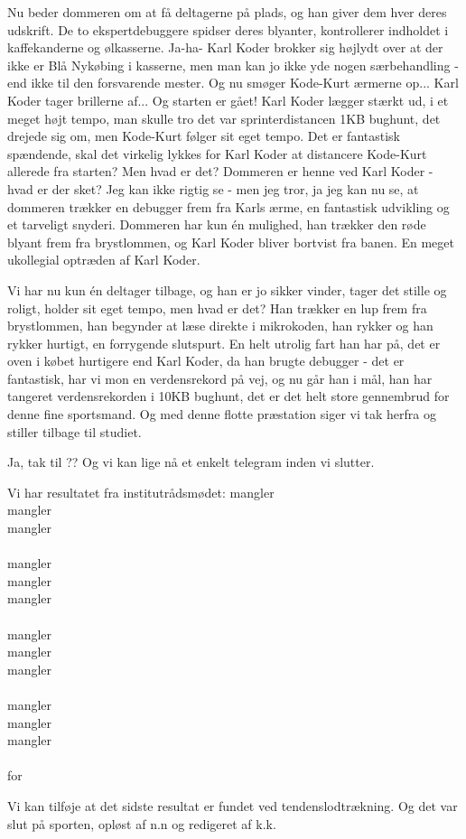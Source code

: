 \documentclass[a4paper,11pt]{article}
\begin{document}
\begin{sketch}
  Nu beder dommeren om at få deltagerne på plads, og han giver dem
  hver deres udskrift.  De to ekspertdebuggere spidser deres blyanter,
  kontrollerer indholdet i kaffekanderne og ølkasserne.  Ja-ha- Karl
  Koder brokker sig højlydt over at der ikke er Blå Nykøbing i
  kasserne, men man kan jo ikke yde nogen særbehandling - end ikke til
  den forsvarende mester.  Og nu smøger Kode-Kurt ærmerne op... Karl
  Koder tager brillerne af... Og starten er gået!  Karl Koder lægger
  stærkt ud, i et meget højt tempo, man skulle tro det var
  sprinterdistancen 1KB bughunt, det drejede sig om, men Kode-Kurt
  følger sit eget tempo.  Det er fantastisk spændende, skal det
  virkelig lykkes for Karl Koder at distancere Kode-Kurt allerede fra
  starten?  Men hvad er det?  Dommeren er henne ved Karl Koder - hvad
  er der sket?  Jeg kan ikke rigtig se - men jeg tror, ja jeg kan nu
  se, at dommeren trækker en debugger frem fra Karls ærme, en
  fantastisk udvikling og et tarveligt snyderi.  Dommeren har kun én
  mulighed, han trækker den røde blyant frem fra brystlommen, og Karl
  Koder bliver bortvist fra banen.  En meget ukollegial optræden af
  Karl Koder.

  Vi har nu kun én deltager tilbage, og han er jo sikker vinder, tager
  det stille og roligt, holder sit eget tempo, men hvad er det?  Han
  trækker en lup frem fra brystlommen, han begynder at læse direkte i
  mikrokoden, han rykker og han rykker hurtigt, en forrygende
  slutspurt.  En helt utrolig fart han har på, det er oven i købet
  hurtigere end Karl Koder, da han brugte debugger - det er
  fantastisk, har vi mon en verdensrekord på vej, og nu går han i mål,
  han har tangeret verdensrekorden i 10KB bughunt, det er det helt
  store gennembrud for denne fine sportsmand.  Og med denne flotte
  præstation siger vi tak herfra og stiller tilbage til studiet.

   Ja, tak til ?? Og vi kan lige nå et enkelt telegram inden
  vi slutter.

  Vi har resultatet fra institutrådsmødet:
  mangler\\
  mangler\\
  mangler\\
\hfill\\
  mangler\\
  mangler\\
  mangler\\
\hfill\\
  mangler\\
  mangler\\
  mangler\\
\hfill\\
  mangler\\
  mangler\\
  mangler\\
\hfill\\
for

Vi kan tilføje at det sidste resultat er fundet ved
tendenslodtrækning.  Og det var slut på sporten, opløst af n.n og
redigeret af k.k.

\end{sketch}
\end{document}
